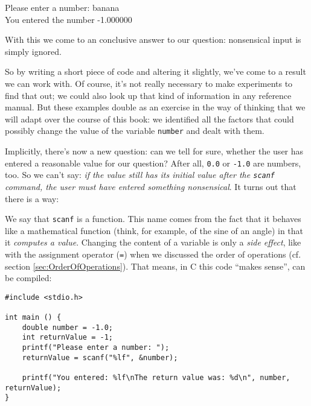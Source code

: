 \begin{cmdbox}
Please enter a number: banana \\
You entered the number -1.000000
\end{cmdbox}

With this we come to an conclusive answer to our question: nonsensical input is simply ignored.

\begin{hintbox}
So by writing a short piece of code and altering it slightly, we've come to a result we can work with. Of course, it's not really necessary to make experiments to find that out; we could also look up that kind of information in any reference manual. But these examples double as an exercise in the way of thinking that we will adapt over the course of this book: we identified all the factors that could possibly change the value of the variable \texttt{number} and dealt with them.
\end{hintbox}

Implicitly, there's now a new question: can we tell for sure, whether the user has entered a reasonable value for our question? After all, \texttt{0.0} or \texttt{-1.0} are numbers, too. So we can't say: \emph{if the value still has its initial value after the \texttt{scanf} command, the user must have entered something nonsensical}. It turns out that there is a way:

We say that \texttt{scanf} is a function. This name comes from the fact that it behaves like a mathematical function (think, for example, of the sine of an angle) in that it \emph{computes a value}. Changing the content of a variable is only a \emph{side effect}, like with the assignment operator (\texttt{=}) when we discussed the order of operations (cf. section \ref{sec:OrderOfOperations}). That means, in C this code \enquote{makes sense}, \ie can be compiled:
\begin{codebox}[returnValue.c]
\begin{verbatim}
#include <stdio.h>

int main () {
    double number = -1.0;
    int returnValue = -1;
    printf("Please enter a number: ");
    returnValue = scanf("%lf", &number);
    
    printf("You entered: %lf\nThe return value was: %d\n", number, returnValue);
}
\end{verbatim}
\end{codebox}

